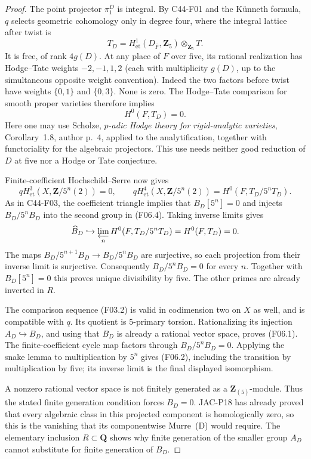 \documentclass[11pt]{article}
\theoremstyle{remark}\newtheorem{remark}[theorem]{Remark}
\begin{document}
\begin{proof}
The point projector $\pi_1^D$ is integral.  By C44-F01 and
the K\"unneth formula, $q$ selects geometric cohomology only in
degree four, where the integral lattice after twist is
\[
 T_D=H^1_{\mathrm{et}}(D_{\overline F},\mathbf Z_5)
                  \otimes_{\mathbf Z_5}T.
\]
It is free, of rank $4g(D)$.  At any place of $F$ over five,
its rational realization has Hodge--Tate weights
$-2,-1,1,2$ (each with multiplicity $g(D)$, up to the
simultaneous opposite weight convention).  Indeed the two
factors before twist have weights $\{0,1\}$ and $\{0,3\}$.
None is zero.  The Hodge--Tate comparison for smooth proper
varieties therefore implies
\[
                 H^0(F,T_D)=0.                 \tag{F06.3}
\]
Here one may use Scholze, \emph{$p$-adic Hodge theory for
rigid-analytic varieties}, Corollary~1.8, author p.~4, applied
to the analytification, together with functoriality for the
algebraic projectors.  This use needs neither good reduction
of $D$ at five nor a Hodge or Tate conjecture.

Finite-coefficient Hochschild--Serre now gives
\[
 qH^3_{\mathrm{et}}(X,\mathbf Z/5^n(2))=0,
 \qquad
 qH^4_{\mathrm{et}}(X,\mathbf Z/5^n(2))
       =H^0(F,T_D/5^nT_D).
                                                        \tag{F06.4}
\]
As in C44-F03, the coefficient triangle implies that
$B_D[5^n]=0$ and injects $B_D/5^nB_D$ into the second group
in (F06.4).  Taking inverse limits gives
\[
 \widehat B_D\hookrightarrow
        \varprojlim_n H^0(F,T_D/5^nT_D)
        =H^0(F,T_D)=0.
\]
The maps $B_D/5^{n+1}B_D\to B_D/5^nB_D$ are surjective,
so each projection from their inverse limit is surjective.
Consequently $B_D/5^nB_D=0$ for every $n$.  Together with
$B_D[5^n]=0$ this proves unique divisibility by five.
The other primes are already inverted in $R$.

The comparison sequence (F03.2) is valid in codimension two
on $X$ as well, and is compatible with $q$.  Its quotient
is $5$-primary torsion.  Rationalizing its injection
$A_D\hookrightarrow B_D$, and using that $B_D$ is already
a rational vector space, proves (F06.1).  The finite-coefficient
cycle map factors through $B_D/5^nB_D=0$.  Applying the snake
lemma to multiplication by $5^n$ gives (F06.2), including the
transition by multiplication by five; its inverse limit is
the final displayed isomorphism.

A nonzero rational vector space is not finitely generated as
a $\mathbf Z_{(5)}$-module.  Thus the stated finite generation
condition forces $B_D=0$.  JAC-P18 has already proved that
every algebraic class in this projected component is
homologically zero, so this is the vanishing that its
componentwise Murre~(D) would require.  The elementary inclusion
$R\subset\mathbf Q$ shows why finite generation of the smaller
group $A_D$ cannot substitute for finite generation of $B_D$.
\end{proof}
\end{document}
